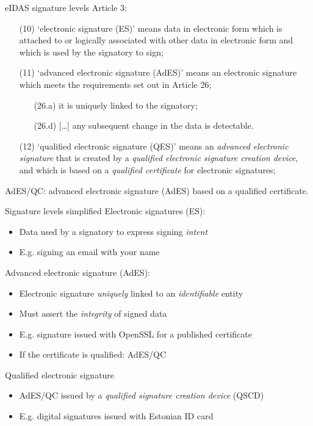 \begin{frame}{eIDAS signature levels}
  Article 3:
  \begin{itemize}[<+(1)->]
    \item[(10)] `electronic signature (ES)' means data in electronic form which is attached to or logically associated with other data in electronic form and which is used by the signatory to sign;
    \item[(11)] `advanced electronic signature (AdES)' means an electronic signature which meets the requirements set out in Article 26;
    \begin{enumerate}
      \item[(26.a)] it is uniquely linked to the signatory;
      \item[(26.d)] [\dots] any subsequent change in the data is detectable.
    \end{enumerate}
    \item[(12)] `qualified electronic signature (QES)' means an \emph{advanced electronic signature} that is created by a \emph{qualified electronic signature creation device}, and which is based on a \emph{qualified certificate} for electronic signatures;
  \end{itemize}

  \pause
  AdES/QC: advanced electronic signature (AdES) based on a qualified certificate.
\end{frame}

\begin{frame}{Signature levels simplified}
  \pause
  Electronic signatures (ES):
  \begin{itemize}[<+(1)->]
    \item Data used by a signatory to express signing \emph{intent}
    \item E.g. signing an email with your name
  \end{itemize}

  \pause
  Advanced electronic signature (AdES):
  \begin{itemize}[<+(1)->]
    \item Electronic signature \emph{uniquely} linked to an \emph{identifiable} entity
    \item Must assert the \emph{integrity} of signed data
    \item E.g. signature issued with OpenSSL for a published certificate
    \item If the certificate is qualified: AdES/QC
  \end{itemize}

  \pause
  Qualified electronic signature
  \begin{itemize}[<+(1)->]
    \item AdES/QC issued by a \emph{qualified signature creation device} (QSCD)
    \item E.g. digital signatures issued with Estonian ID card
  \end{itemize}
\end{frame}

